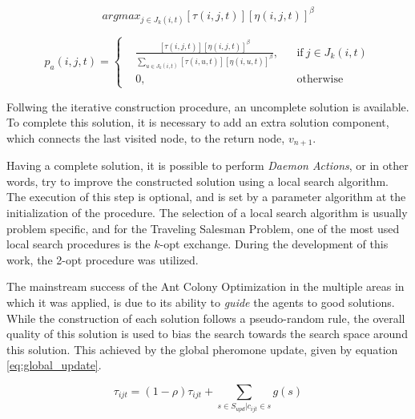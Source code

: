 \begin{equation}
  \label{eq:exploitation}
    arg max_{j \in J_k(i,t)} {[\tau(i,j,t)][\eta(i,j,t)]^\beta}
\end{equation}


\begin{equation}
\label{eq:exploration}
  p_a(i,j,t) =  \left \{
    \begin{aligned}
      & \frac{[\tau(i,j,t)][\eta(i,j,t)]^\beta}{\sum_{u \in J_k(i,t)}[\tau(i,u,t)][\eta(i,u,t)]^\beta}, && \text{if}\ j \in J_k(i,t) \\
      &0, && \text{otherwise}
    \end{aligned} \right. 
\end{equation}

Follwing the iterative construction procedure, an uncomplete solution is available.
To complete this solution, it is necessary to add an extra solution component, which connects the last visited node,
to the return node, $v_{n+1}$.

Having a complete solution, it is possible to perform \textit{Daemon Actions}, or in other words, try to improve 
the constructed solution using a local search algorithm. The execution of this step is optional,
and is set by a parameter algorithm at the initialization of the procedure.
The selection of a local search algorithm is usually problem specific,
and for the Traveling Salesman Problem, one of the most used local search procedures is the $k$-opt exchange.
During the development of this work, the 2-opt procedure was utilized.

The mainstream success of the Ant Colony Optimization in the multiple areas in which it was applied,
is due to its ability to \textit{guide} the agents to good solutions.
While the construction of each solution follows a pseudo-random rule,
the overall quality of this solution is used to bias the search towards the search space around this solution.
This achieved by the global pheromone update, given by equation \ref{eq:global_update}.


\begin{equation}
\label{eq:global_update}
  \tau_{ijt} = (1-\rho)\tau_{ijt} + \sum_{s \in S_{upd} | c_{ijt} \in s} g(s)
\end{equation}

